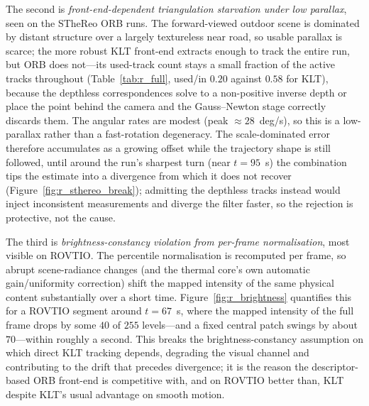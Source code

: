 The second is \emph{front-end-dependent triangulation starvation under low parallax}, seen on the STheReo ORB runs. The forward-viewed outdoor scene is dominated by distant structure over a largely textureless near road, so usable parallax is scarce; the more robust KLT front-end extracts enough to track the entire run, but ORB does not---its used-track count stays a small fraction of the active tracks throughout (Table~\ref{tab:r_full}, used/in $0.20$ against $0.58$ for KLT), because the depthless correspondences solve to a non-positive inverse depth or place the point behind the camera and the Gauss--Newton stage correctly discards them. The angular rates are modest (peak $\approx 28$~deg/s), so this is a low-parallax rather than a fast-rotation degeneracy. The scale-dominated error therefore accumulates as a growing offset while the trajectory shape is still followed, until around the run's sharpest turn (near $t=95$~s) the combination tips the estimate into a divergence from which it does not recover (Figure~\ref{fig:r_sthereo_break}); admitting the depthless tracks instead would inject inconsistent measurements and diverge the filter faster, so the rejection is protective, not the cause.

The third is \emph{brightness-constancy violation from per-frame normalisation}, most visible on ROVTIO. The percentile normalisation is recomputed per frame, so abrupt scene-radiance changes (and the thermal core's own automatic gain/uniformity correction) shift the mapped intensity of the same physical content substantially over a short time. Figure~\ref{fig:r_brightness} quantifies this for a ROVTIO segment around $t=67$~s, where the mapped intensity of the full frame drops by some $40$ of $255$ levels---and a fixed central patch swings by about $70$---within roughly a second. This breaks the brightness-constancy assumption on which direct KLT tracking depends, degrading the visual channel and contributing to the drift that precedes divergence; it is the reason the descriptor-based ORB front-end is competitive with, and on ROVTIO better than, KLT despite KLT's usual advantage on smooth motion.

